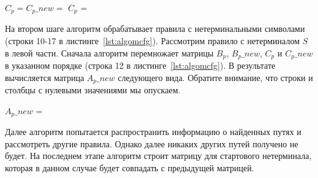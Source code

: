 \begin{center}
	$C_p = C_p\_new = $ $C_p$ = 
\end{center}





На втором шаге алгоритм обрабатывает правила с нетерминальными символами (строки 10-17 в листинге~\ref{lst:algomcfg}). Рассмотрим правило с нетерминалом $S$ в левой части. Сначала алгоритм перемножает матрицы $B_p$, $B_p\_new$, $C_p$ и $C_p\_new$ в указанном порядке (строка 12 в листинге~\ref{lst:algomcfg}). В результате вычисляется матрица $A_p\_{new}$ следующего вида. Обратите внимание, что строки и столбцы с нулевыми значениями мы опускаем.

\begin{center}
	$A_p\_new$ = 
\end{center}

Далее алгоритм попытается распространить информацию о найденных путях и рассмотреть другие правила. Однако далее никаких других путей получено не будет. На последнем этапе алгоритм строит матрицу для стартового нетерминала, которая в данном случае будет совпадать с предыдущей матрицей.

